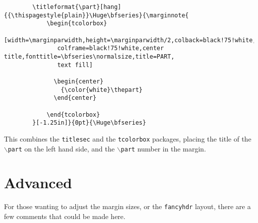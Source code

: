 \documentclass[10pt]{article}
\begin{document}
\begin{fullpage}
	\begin{verbatim}
		\titleformat{\part}[hang]{{\thispagestyle{plain}}\Huge\bfseries}{\marginnote{
			\begin{tcolorbox}
			[width=\marginparwidth,height=\marginparwidth/2,colback=black!75!white,
			   colframe=black!75!white,center title,fonttitle=\bfseries\normalsize,title=PART,
			   text fill]

			  \begin{center}
			  	{\color{white}\thepart}
			  \end{center}

			\end{tcolorbox}
		}[-1.25in]}{0pt}{\Huge\bfseries}
	\end{verbatim}
\end{fullpage}

This combines the \texttt{titlesec} and the \texttt{tcolorbox} packages, placing the title of the \texttt{\( \backslash \)part} on the left hand side, and the \texttt{\( \backslash \)part} number in the margin.


\part{Advanced}
For those wanting to adjust the margin sizes, or the \texttt{fancyhdr} layout, there are a few comments that could be made here.
\end{document}
